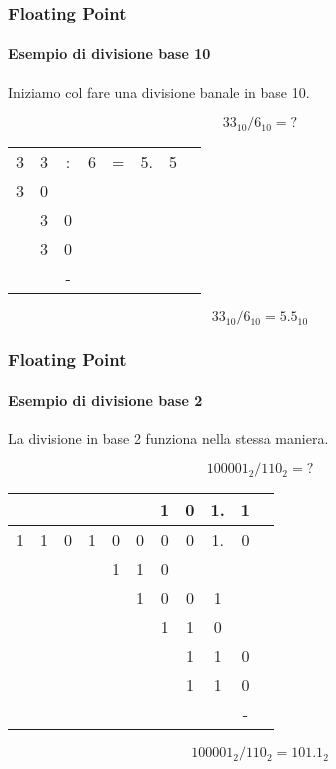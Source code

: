 \documentclass{beamer}
\begin{document}
  \begin{frame}
	    \frametitle{Floating Point}
	    \framesubtitle{Esempio di divisione base 10}
				    
	    Iniziamo col fare una divisione banale in base 10.
	    
	    $$33_{10} / 6_{10} = ?$$
	    
	    \pause
	    \vspace{2em}
	    \begin{center}
	    		\setlength{\tabcolsep}{2pt}
	    		\begin{tabular}{cccccccc}
	    			3 & 3 & : & 6 & = & 5. & 5 \\
	    			3 & 0 &   &   &   &    &   \\
	    			\hline
	    			  & 3 & 0 &   &   &    &   \\
	    			  & 3 & 0 &   &   &    &   \\
	    			\hline
	    			  &   & - &   &   &    &   \\
	    		\end{tabular}
	    \end{center}
	    \pause
	    \vspace{2em}
	    $$33_{10} / 6_{10} = 5.5_{10}$$
	\end{frame}

  \begin{frame}
	    \frametitle{Floating Point}
	    \framesubtitle{Esempio di divisione base 2}
				    
	    La divisione in base 2 funziona nella stessa maniera.
	    
	    $$100001_{2} / 110_{2} = ?$$
	    
	    \pause
	    \vspace{2em}
	    \begin{center}
	    		\setlength{\tabcolsep}{2pt}
	    		\begin{tabular}{ccc|cccccccc}
	    				&   &   &   &   &   & 1 & 0 & 1. & 1	\\
	    		  \hline    			
	    			1 & 1 & 0 & 1 & 0 & 0 & 0 & 0 & 1. & 0 \\
	    			  &   &   &   & 1 & 1 & 0 &   &   &    \\
	    			\hline
	    			  &   &   &   &   & 1 & 0 & 0 & 1 &    \\
	    			  &   &   &   &   &   & 1 & 1 & 0 &    \\
	    			\hline
	    			  &   &   &   &   &   &   & 1 & 1 & 0  \\
	    			  &   &   &   &   &   &   & 1 & 1 & 0  \\
	    			\hline
	    			  &   &   &   &   &   &   &   &   & -  \\
	    		\end{tabular}
	    \end{center}
	    \pause
	    \vspace{2em}
	    $$100001_{2} / 110_{2} = 101.1_{2}$$
	\end{frame}
\end{document}
